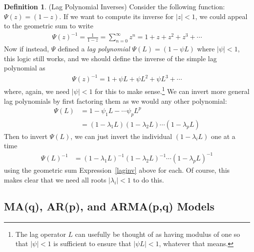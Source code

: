 \documentclass[12pt]{article}
\theoremstyle{plain}
\theoremstyle{definition}
\newtheorem{defn}[thm]{Definition}
\theoremstyle{remark}
\newcommand{\sumninfz}{\sum^\infty_{n=0}}
\begin{document}
\begin{defn}(Lag Polynomial Inverses)
Consider the following function: $\Psi(z)=(1-z)$. If we want to compute
its inverse for $|z|<1$, we could appeal to the geometric sum to write
\begin{align*}
  \Psi(z)^{-1} = \frac{1}{1-z}
  = \sumninfz z^n
  = 1+z+z^2 + z^3 + \cdots
\end{align*}
Now if instead, $\Psi$ defined a \emph{lag polynomial} $\Psi(L) =
(1-\psi L)$ where $|\psi|<1$, this logic still works, and we should
define the inverse of the simple lag polynomial as
\begin{align}
  \Psi(z)^{-1}
  = 1+\psi L+\psi L^2 + \psi L^3 + \cdots
  \label{laginv}
\end{align}
where, again, we need $|\psi|<1$ for this to make sense.\footnote{%
  The lag operator $L$ can usefully be thought of as having modulus of
  one so that $|\psi|<1$ is sufficient to ensure that $|\psi L|<1$,
  whatever that means.
}
We can invert more general lag polynomials by first factoring them as we
would any other polynomial:
\begin{align*}
  \Psi(L)
  &= 1 - \psi_1 L - \cdots \psi_pL^p \\
  &= (1-\lambda_1L)(1-\lambda_2L)\cdots(1-\lambda_pL)
\end{align*}
Then to invert $\Psi(L)$, we can just invert the individual
$(1-\lambda_iL)$ one at a time
\begin{align*}
  \Psi(L)^{-1}
  &= (1-\lambda_1L)^{-1}(1-\lambda_2L)^{-1}\cdots(1-\lambda_pL)^{-1}
\end{align*}
using the geometric sum Expression~\ref{laginv} above for each.
Of course, this makes clear that we need all roots $|\lambda_i|<1$ to do
this.
\end{defn}


\clearpage
\subsection{MA(q), AR(p), and ARMA(p,q) Models}
\end{document}
